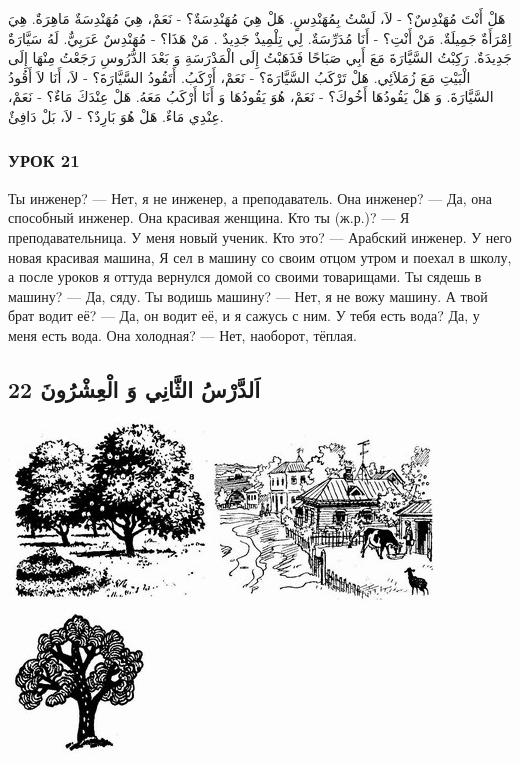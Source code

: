 \documentclass[a5paper]{article}
\begin{document}
هَلْ أَنْتَ مُهَنْدِسٌ؟ - لاَ، لَسْتُ بِمُهَنْدِسٍ. هَلْ هِيَ مُهَنْدِسَةٌ؟ - نَعَمْ، هِيَ مُهَنْدِسَةٌ مَاهِرَةٌ. هِيَ اِمْرَأَةٌ جَمِيلَةٌ. مَنْ أَنْتِ؟ - أَنَا مُدَرِّسَةٌ. لِي تِلْمِيذٌ جَدِيدٌ . مَنْ هَذَا؟ - مُهَنْدِسٌ عَرَبِيٌّ. لَهُ سَيَّارَةٌ جَدِيدَةٌ. رَكِبْتُ السَّيَّارَةَ مَعَ أَبِي صَبَاحًا فَذَهَبْتُ إِلَى الْمَدْرَسَةِ وَ بَعْدَ الدُّرُوسِ رَجَعْتُ مِنْهَا إِلَى الْبَيْتِ مَعَ زُمَلاَئِي. هَلْ تَرْكَبُ السَّيَّارَةَ؟ - نَعَمْ، أَرْكَبُ. أَتَقُودُ السَّيَّارَةَ؟ - لاَ، أَنَا لاَ أَقُودُ السَّيَّارَةَ. وَ هَلْ يَقُودُهَا أَخُوكَ؟ - نَعَمْ، هُوَ يَقُودُهَا وَ أَنَا أَرْكَبُ مَعَهُ. هَلْ عِنْدَكَ مَاءٌ؟ - نَعَمْ، عِنْدِي مَاءٌ. هَلْ هُوَ بَارِدٌ؟ - لاَ، بَلْ دَافِئٌ.

\subsubsection{УРОК 21}
Ты инженер? — Нет, я не инженер, а преподаватель. Она инже­нер? — Да, она способный инженер. Она красивая женщина. Кто ты (ж.р.)? — Я преподавательница. У меня новый ученик. Кто это? — Арабский инженер. У него новая красивая машина, Я сел в машину со своим отцом утром и поехал в школу, а после уроков я оттуда вернулся домой со своими товарищами. Ты сядешь в машину? — Да, сяду. Ты водишь машину? — Нет, я не вожу машину. А твой брат водит её? — Да, он водит её, и я сажусь с ним. У тебя есть во­да? Да, у меня есть вода. Она холодная? — Нет, наоборот, тёплая.‏

\subsection{22 اَلدَّرْسُ الثَّانِي وَ الْعِشْرُونَ}
 \includegraphics[width=2.0835in,height=1.8752in]{MuhammadBagauddinlatinized-img036.jpg}   \includegraphics[width=2.2917in,height=1.7291in]{MuhammadBagauddinlatinized-img037.jpg}   \includegraphics[width=1.448in,height=1.5626in]{MuhammadBagauddinlatinized-img038.jpg} 
\end{document}
